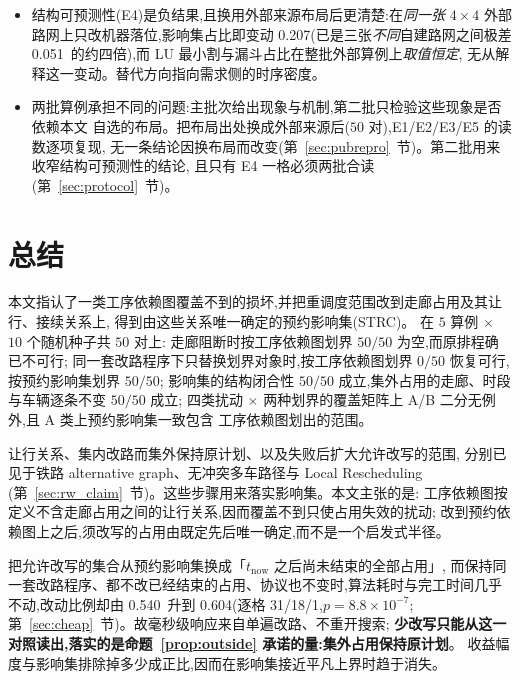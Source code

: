 \documentclass[manuscript,screen,review]{acmart}
\providecommand{\STRC}{\textsc{STRC}}
\newcommand{\NInst}{5}
\newcommand{\NSeeds}{10}
\newcommand{\NPairs}{50}
\newcommand{\PassMiss}{\NPairs/\NPairs}      %
\newcommand{\FeasRone}{0/\NPairs}            %
\newcommand{\FeasRtwo}{\NPairs/\NPairs}      %
\newcommand{\PassClosed}{\NPairs/\NPairs}    %
\newcommand{\PassInvar}{\NPairs/\NPairs}     %
\newcommand{\NPubPairs}{50}
\newcommand{\PubCloSpread}{0.207}
\newcommand{\SelfCloSpread}{0.051}
\newcommand{\ResFracCheapRtwo}{0.540}
\newcommand{\ResFracAllFuture}{0.604}
\newcommand{\RAStabWTL}{31/18/1}     %
\newcommand{\RAStabP}{8.8\times10^{-7}}  %
\begin{document}
\begin{itemize}[leftmargin=1.5em,itemsep=0.25em]
空范围对边权不敏感;可行率只在二分边上掉了一格。
\item 结构可预测性(E4)是负结果,且换用外部来源布局后更清楚:在\emph{同一张} \(4\times 4\)
外部路网上只改机器落位,影响集占比即变动 \PubCloSpread(已是三张\emph{不同}自建路网之间极差
\SelfCloSpread\ 的约四倍),而 LU 最小割与漏斗占比在整批外部算例上\emph{取值恒定},
无从解释这一变动。替代方向指向需求侧的时序密度。
\item 两批算例承担不同的问题:主批次给出现象与机制,第二批只检验这些现象是否依赖本文
自选的布局。把布局出处换成外部来源后(\(\NPubPairs\) 对),E1/E2/E3/E5 的读数逐项复现,
无一条结论因换布局而改变(第~\ref{sec:pubrepro}~节)。第二批用来收窄结构可预测性的结论,
且只有 E4 一格必须两批合读(第~\ref{sec:protocol}~节)。
\end{itemize}


\section{总结}
\label{sec:conclusion}

本文指认了一类工序依赖图覆盖不到的损坏,并把重调度范围改到走廊占用及其让行、接续关系上,
得到由这些关系唯一确定的预约影响集(\STRC)。
在 \(\NInst\) 算例 \(\times\) \(\NSeeds\) 个随机种子共 \(\NPairs\) 对上:
走廊阻断时按工序依赖图划界 \(\PassMiss\) 为空,而原排程确已不可行;
同一套改路程序下只替换划界对象时,按工序依赖图划界 \(\FeasRone\) 恢复可行,按预约影响集划界 \(\FeasRtwo\);
影响集的结构闭合性 \(\PassClosed\) 成立,集外占用的走廊、时段与车辆逐条不变 \(\PassInvar\) 成立;
四类扰动 \(\times\) 两种划界的覆盖矩阵上 A/B 二分无例外,且 A 类上预约影响集一致包含
工序依赖图划出的范围。

让行关系、集内改路而集外保持原计划、以及失败后扩大允许改写的范围,
分别已见于铁路 alternative graph、无冲突多车路径与 Local Rescheduling
(第~\ref{sec:rw_claim}~节)。这些步骤用来落实影响集。本文主张的是:
工序依赖图按定义不含走廊占用之间的让行关系,因而覆盖不到只使占用失效的扰动;
改到预约依赖图上之后,须改写的占用由既定先后唯一确定,而不是一个启发式半径。

把允许改写的集合从预约影响集换成「\(t_{\mathrm{now}}\) 之后尚未结束的全部占用」,
而保持同一套改路程序、都不改已经结束的占用、协议也不变时,算法耗时与完工时间几乎不动,改动比例却由
\ResFracCheapRtwo\ 升到 \ResFracAllFuture(逐格 \RAStabWTL,\(p=\RAStabP\);
第~\ref{sec:cheap}~节)。故毫秒级响应来自单遍改路、不重开搜索;
\textbf{少改写只能从这一对照读出,落实的是命题~\ref{prop:outside} 承诺的量:集外占用保持原计划}。
收益幅度与影响集排除掉多少成正比,因而在影响集接近平凡上界时趋于消失。
\end{document}
